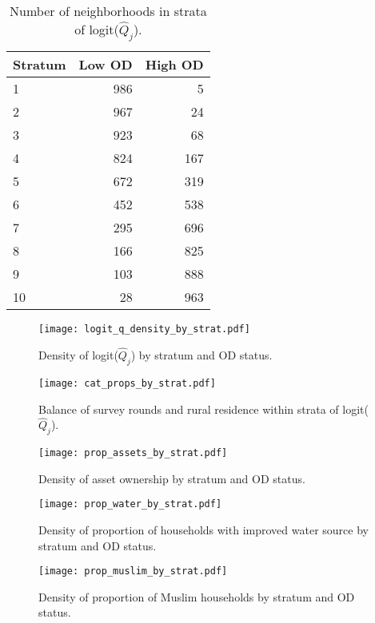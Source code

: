 \documentclass[12pt,a4paper,titlepage]{article}
\begin{document}
\begin{appendices}
\begin{table}[ht]
	\centering
	\begin{tabular}{lrr}
	  \hline
	  \multicolumn{1}{c}{Stratum} & \multicolumn{1}{c}{Low OD} & \multicolumn{1}{c}{High OD} \\ 
	  \hline
	    1 & 986 &   5 \\ 
	    2 & 967 &  24 \\ 
	    3 & 923 &  68 \\ 
	    4 & 824 & 167 \\ 
	    5 & 672 & 319 \\ 
	    6 & 452 & 538 \\ 
	    7 & 295 & 696 \\ 
	    8 & 166 & 825 \\ 
	    9 & 103 & 888 \\ 
	   10 &  28 & 963 \\ 
	   \hline
	\end{tabular}
	\caption{Number of neighborhoods in strata of logit($\widehat{Q}_j$).}
	\label{table:q_strat_sizes}
\end{table}

\begin{figure}
	\centering
	\texttt{[image: logit\_q\_density\_by\_strat.pdf]}
	\caption{Density of logit($\widehat{Q}_j$) by stratum and OD status.}
	\label{fig:logit_q_dens}
\end{figure}

\begin{figure}
	\centering
	\texttt{[image: cat\_props\_by\_strat.pdf]}
	\caption{Balance of survey rounds and rural residence within strata of logit($\widehat{Q}_j$).}
	\label{fig:cat_props}
\end{figure}

\begin{figure}
	\centering
	\texttt{[image: prop\_assets\_by\_strat.pdf]}
	\caption{Density of asset ownership by stratum and OD status.}
	\label{fig:ass_dens}
\end{figure}

\begin{figure}
	\centering
	\texttt{[image: prop\_water\_by\_strat.pdf]}
	\caption{Density of proportion of households with improved water source by stratum and OD status.}
	\label{fig:wat_dens}
\end{figure}

\begin{figure}
	\centering
	\texttt{[image: prop\_muslim\_by\_strat.pdf]}
	\caption{Density of proportion of Muslim households by stratum and OD status.}
	\label{fig:mus_dens}
\end{figure}


\end{appendices}
\end{document}

